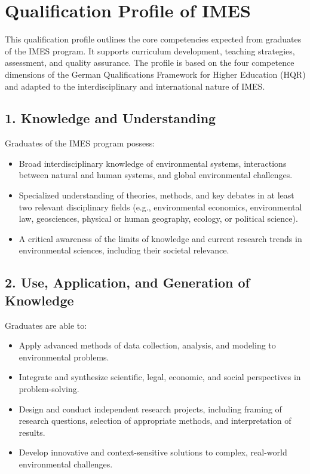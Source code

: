 \documentclass[
  letterpaper,
  10pt,
  openany]{book}
\providecommand{\tightlist}{%
  \setlength{\itemsep}{0pt}\setlength{\parskip}{0pt}}\usepackage{longtable,booktabs,array}
\begin{document}
\section*{Qualification Profile of
IMES}\label{qualification-profile-of-imes}


This qualification profile outlines the core competencies expected from
graduates of the IMES program. It supports curriculum development,
teaching strategies, assessment, and quality assurance. The profile is
based on the four competence dimensions of the German Qualifications
Framework for Higher Education (HQR) and adapted to the
interdisciplinary and international nature of IMES.

\subsection*{1. Knowledge and
Understanding}\label{knowledge-and-understanding}

Graduates of the IMES program possess:

\begin{itemize}
\item
  Broad interdisciplinary knowledge of environmental systems,
  interactions between natural and human systems, and global
  environmental challenges.
\item
  Specialized understanding of theories, methods, and key debates in at
  least two relevant disciplinary fields (e.g., environmental economics,
  environmental law, geosciences, physical or human geography, ecology,
  or political science).
\item
  A critical awareness of the limits of knowledge and current research
  trends in environmental sciences, including their societal relevance.
\end{itemize}

\subsection*{2. Use, Application, and Generation of
Knowledge}\label{use-application-and-generation-of-knowledge}

Graduates are able to:

\begin{itemize}
\tightlist
\item
  Apply advanced methods of data collection, analysis, and modeling to
  environmental problems.
\item
  Integrate and synthesize scientific, legal, economic, and social
  perspectives in problem-solving.
\item
  Design and conduct independent research projects, including framing of
  research questions, selection of appropriate methods, and
  interpretation of results.
\item
  Develop innovative and context-sensitive solutions to complex,
  real-world environmental challenges.
\end{itemize}
\end{document}
